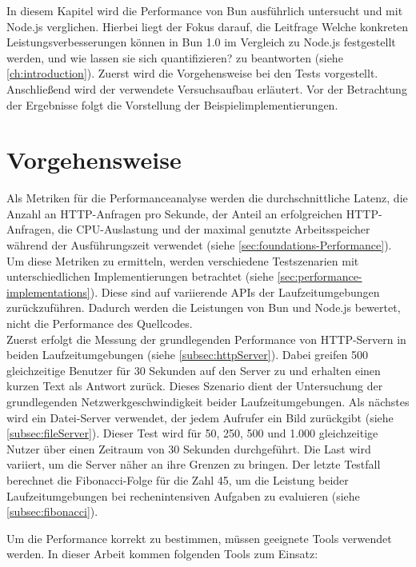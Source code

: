  \label{ch:performanceAnalysis}
In diesem Kapitel wird die Performance von Bun ausführlich untersucht und mit Node.js verglichen. Hierbei liegt der Fokus darauf, die Leitfrage \glqq Welche konkreten Leistungsverbesserungen können in Bun 1.0 im Vergleich zu Node.js festgestellt werden, und wie lassen sie sich quantifizieren?\grqq{} zu beantworten (siehe \autoref{ch:introduction}). Zuerst wird die Vorgehensweise bei den Tests vorgestellt. Anschließend wird der verwendete Versuchsaufbau erläutert. Vor der Betrachtung der Ergebnisse folgt die Vorstellung der Beispielimplementierungen.


\section{Vorgehensweise} \label{sec:performance-approach}
Als Metriken für die Performanceanalyse werden die durchschnittliche Latenz, die Anzahl an HTTP-Anfragen pro Sekunde, der Anteil an erfolgreichen HTTP-Anfragen, die CPU-Auslastung und der maximal genutzte Arbeitsspeicher während der Ausführungszeit verwendet (siehe \autoref{sec:foundations-Performance}). Um diese Metriken zu ermitteln, werden verschiedene Testszenarien mit unterschiedlichen Implementierungen betrachtet (siehe \autoref{sec:performance-implementations}). Diese sind auf variierende APIs der Laufzeitumgebungen zurückzuführen. Dadurch werden die Leistungen von Bun und Node.js bewertet, nicht die Performance des Quellcodes.\\

\noindent
Zuerst erfolgt die Messung der grundlegenden Performance von HTTP-Servern in beiden Laufzeitumgebungen (siehe \autoref{subsec:httpServer}). Dabei greifen 500 gleichzeitige Benutzer für 30 Sekunden auf den Server zu und erhalten einen kurzen Text als Antwort zurück. Dieses Szenario dient der Untersuchung der grundlegenden Netzwerkgeschwindigkeit beider Laufzeitumgebungen. Als nächstes wird ein Datei-Server verwendet, der jedem Aufrufer ein Bild zurückgibt (siehe \autoref{subsec:fileServer}). Dieser Test wird für 50, 250, 500 und 1.000 gleichzeitige Nutzer über einen Zeitraum von 30 Sekunden durchgeführt. Die Last wird variiert, um die Server näher an ihre Grenzen zu bringen. Der letzte Testfall berechnet die Fibonacci-Folge für die Zahl 45, um die Leistung beider Laufzeitumgebungen bei rechenintensiven Aufgaben zu evaluieren (siehe \autoref{subsec:fibonacci}).

\noindent
Um die Performance korrekt zu bestimmen, müssen geeignete Tools verwendet werden. In dieser Arbeit kommen folgenden Tools zum Einsatz:

